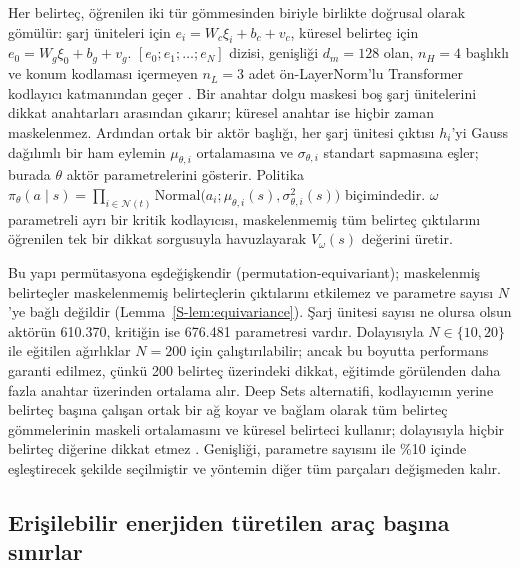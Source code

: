 Her belirteç, öğrenilen iki tür gömmesinden biriyle birlikte doğrusal olarak gömülür: şarj üniteleri için $e_i=W_c\xi_i+b_c+v_c$, küresel belirteç için $e_0=W_g\xi_0+b_g+v_g$.
$[e_0;e_1;\dots;e_N]$ dizisi, genişliği $d_m=128$ olan, $n_H=4$ başlıklı ve konum kodlaması içermeyen $n_L=3$ adet ön-LayerNorm'lu Transformer kodlayıcı katmanından geçer \cite{vaswani2017attention,ba2016layer,xiong2020layer}.
Bir anahtar dolgu maskesi boş şarj ünitelerini dikkat anahtarları arasından çıkarır; küresel anahtar ise hiçbir zaman maskelenmez.
Ardından ortak bir aktör başlığı, her şarj ünitesi çıktısı $h_i$'yi Gauss dağılımlı bir ham eylemin $\mu_{\theta,i}$ ortalamasına ve $\sigma_{\theta,i}$ standart sapmasına eşler; burada $\theta$ aktör parametrelerini gösterir.
Politika $\pi_\theta(a\mid s)=\prod_{i\in\mathcal N(t)}\mathrm{Normal}\big(a_i;\mu_{\theta,i}(s),\sigma_{\theta,i}^2(s)\big)$ biçimindedir.
$\omega$ parametreli ayrı bir kritik kodlayıcısı, maskelenmemiş tüm belirteç çıktılarını öğrenilen tek bir dikkat sorgusuyla \cite{lee2019set} havuzlayarak $V_\omega(s)$ değerini üretir.

Bu yapı permütasyona eşdeğişkendir (permutation-equivariant); maskelenmiş belirteçler maskelenmemiş belirteçlerin çıktılarını etkilemez ve parametre sayısı $N$'ye bağlı değildir (Lemma~\ref{S-lem:equivariance}).
Şarj ünitesi sayısı ne olursa olsun aktörün 610.370, kritiğin ise 676.481 parametresi vardır.
Dolayısıyla $N\in\{10,20\}$ ile eğitilen ağırlıklar $N=200$ için çalıştırılabilir; ancak bu boyutta performans garanti edilmez, çünkü 200 belirteç üzerindeki dikkat, eğitimde görülenden daha fazla anahtar üzerinden ortalama alır.
Deep Sets alternatifi, kodlayıcının yerine belirteç başına çalışan ortak bir ağ koyar ve bağlam olarak tüm belirteç gömmelerinin maskeli ortalamasını ve küresel belirteci kullanır; dolayısıyla hiçbir belirteç diğerine dikkat etmez \cite{zaheer2017deep}.
Genişliği, parametre sayısını \method{} ile \%10 içinde eşleştirecek şekilde seçilmiştir ve yöntemin diğer tüm parçaları değişmeden kalır.

\subsection{Erişilebilir enerjiden türetilen araç başına sınırlar}\label{sec:bounds}

